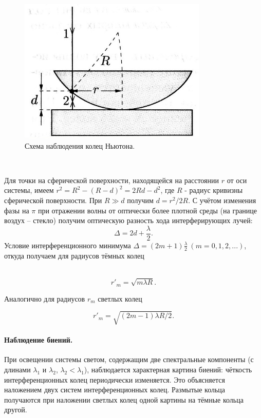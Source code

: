 \documentclass[a4paper, 12pt, twoside]{article}
\begin{document}
	\begin{minipage}{0.49\linewidth}
		\begin{figure}[H]
			\centering
			\includegraphics[width =  0.8\textwidth]{img1}
			\caption{Схема наблюдения колец Ньютона.}
			\label{img1}
		\end{figure}
	\end{minipage}
	~
	\begin{minipage}{0.49\linewidth}
		Для точки на сферической поверхности, находящейся на расстоянии $r$ от оси системы, имеем $r^2 = R^2 - (R - d)^2 = 2Rd - d^2$, где $R$ - радиус кривизны сферической поверхности. При $R \gg d$ получим $d = r^2/2R$. С учётом изменения фазы на $\pi$ при отражении волны от оптически более плотной среды (на границе воздух -- стекло) получим оптическую разность хода интерферирующих лучей: $$\Delta = 2d + \dfrac{\lambda}{2}.$$
		Условие интерференционного минимума $\Delta = (2m + 1)\frac{\lambda}{2}~(m = 0, 1, 2, ...)$, откуда получаем для радиусов тёмных колец
	\end{minipage}\\
	
	\begin{equation}
	r'_m = \sqrt{m\lambda R}.
	\label{eq1}
	\end{equation}
	
	Аналогично для радиусов $r_m$ светлых колец 
	
	\begin{equation}
	r'_m = \sqrt{(2m - 1) \lambda R/2}.
	\label{eq2}
	\end{equation}
	
	\paragraph*{Наблюдение биений.} При освещении системы светом, содержащим две спектральные компоненты (с длинами $\lambda_1$ и $\lambda_2$, $\lambda_2 < \lambda_1$), наблюдается характерная картина биений: чёткость интерференционных колец периодически изменяется. Это объясняется наложением двух систем интерференционных колец. Размытые кольца получаются при наложении светлых колец одной картины на тёмные кольца другой.
	
\end{document}
